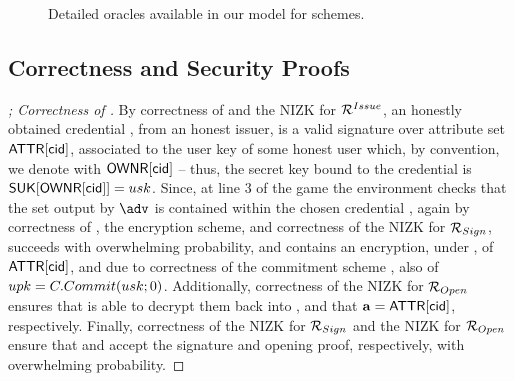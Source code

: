 {\begin{figure*}[ht!]
{\begin{minipage}[t]{.5\textwidth}
        
      \end{minipage}
      
    }

    \caption{Detailed oracles available in our model for \GSAC schemes.}
    \label{fig:oracles}
  \end{figure*}
}

\subsection{Correctness and Security Proofs}
\label{sapp:gsac-proofs}


\begin{proof}[; Correctness of \GSACGen]
  By correctness of \SBCM and the NIZK for $\mathcal{R}^{Issue}$, an honestly
  obtained credential \cid, from an honest issuer, is a valid \SBCM signature
  over
  attribute set $\mathsf{ATTR}[\mathsf{cid}]$, associated to the user key of some honest user
  which, by convention, we denote with $\mathsf{OWNR}[\mathsf{cid}]$ -- thus, the secret key
  bound to the credential is $\mathsf{S}\mathsf{UK}[\mathsf{OWNR}[\mathsf{cid}]]=usk$. Since, at line 3 of the
  \ExpGSACCorrect game the environment checks that the \dattrs set output by
  $\adv$ is contained within the chosen credential \cid, again by correctness of
  \SBCM, the encryption scheme, and correctness of the NIZK for
  $\mathcal{R}_{Sign}$, \Sign succeeds with overwhelming
  probability, and \sig contains an encryption, under \opk, of $\mathsf{ATTR}[\mathsf{cid}]$,
  and due to correctness of the commitment scheme \C, also of $upk =
  C.Commit(usk;0)$. Additionally, correctness of the NIZK for
  $\mathcal{R}_{Open}$ ensures that \Open is able to decrypt them back into \upk,
  and that $\mathbf{a}=
  \mathsf{ATTR}[\mathsf{cid}]$, respectively. Finally, correctness of the NIZK for
  $\mathcal{R}_{Sign}$ and the NIZK for $\mathcal{R}_{Open}$ ensure that \Verify and
  \Judge accept the signature and opening proof, respectively, with overwhelming
  probability.
\end{proof}

